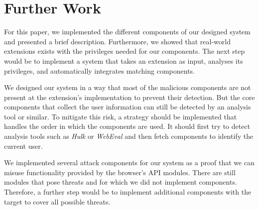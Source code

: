 
\chapter{Further Work}
\label{chp:furhterWork}

	For this paper, we implemented the different components of our designed system and presented a brief description. Furthermore, we showed that real-world extensions exists with the privileges needed for our components. The next step would be to implement a system that takes an extension as input, analyses its privileges, and automatically integrates matching components. 

	We designed our system in a way that most of the malicious components are not present at the extension's implementation to prevent their detection. But the core components that collect the user information can still be detected by an analysis tool or similar. To mitigate this risk, a strategy should be implemented that handles the order in which the components are used. It should first try to detect analysis tools such as \textit{Hulk}\cite{184485} or \textit{WebEval}\cite{190984} and then fetch components to identify the current user.
	
	We implemented several attack components for our system as a proof that we can misuse functionality provided by the browser's API modules. There are still modules that pose threats and for which we did not implement components. Therefore, a further step would be to implement additional components with the target to cover all possible threats. 